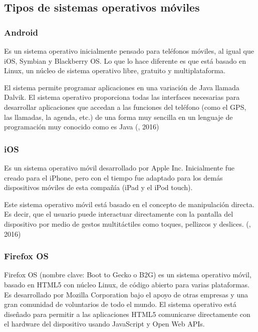 \setlength{\parskip}{0mm}
\subsection{Tipos de sistemas operativos móviles}

\subsubsection{Android} 
\setlength{\parskip}{5mm}
Es un sistema operativo inicialmente pensado para teléfonos móviles, al igual que iOS, Symbian y Blackberry OS. Lo que lo hace diferente es que está basado en Linux, un núcleo de sistema operativo libre, gratuito y multiplataforma.

El sistema permite programar aplicaciones en una variación de Java llamada Dalvik. El sistema operativo proporciona todas las interfaces necesarias para desarrollar aplicaciones que accedan a las funciones del teléfono (como el GPS, las llamadas, la agenda, etc.) de una forma muy sencilla en un lenguaje de programación muy conocido como es Java
\setlength{\parskip}{0mm}
(\citet{androidbib}, 2016)

\subsubsection{iOS} 
\setlength{\parskip}{5mm}
Es un sistema operativo móvil desarrollado por Apple Inc. Inicialmente fue creado para el iPhone, pero con el tiempo fue adaptado para los demás dispositivos móviles de esta compañía (iPad y el iPod touch).

Este sistema operativo móvil está basado en el concepto de manipulación directa. Es decir, que el usuario puede interactuar directamente con la pantalla del dispositivo por medio de gestos multitáctiles como toques, pellizcos y deslices.
\setlength{\parskip}{0mm}
(\citet{iosbib}, 2016)


\subsubsection{Firefox OS}
\setlength{\parskip}{5mm}
Firefox OS (nombre clave: Boot to Gecko o B2G) es un sistema operativo móvil, basado en HTML5 con núcleo Linux, de código abierto para varias plataformas. Es desarrollado por Mozilla Corporation bajo el apoyo de otras empresas y una gran comunidad de voluntarios de todo el mundo. El sistema operativo está diseñado para permitir a las aplicaciones HTML5 comunicarse directamente con el hardware del dispositivo usando JavaScript y Open Web APIs.

